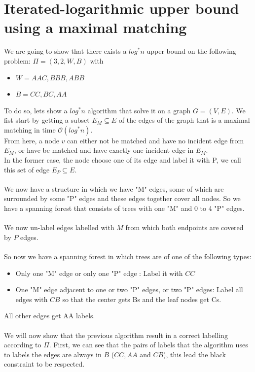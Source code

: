 \section{Iterated-logarithmic upper bound using a maximal matching}
We are going to show that there exists a $log^*n$ upper bound on the following problem:
$\Pi = (3,2,W,B)$
with
\begin{itemize}
    \item $W = AAC, BBB, ABB$
    \item $B = CC, BC, AA$
\end{itemize}
To do so, lets show a $log^*n$ algorithm that solve it on a graph $G=(V,E)$.
We fist start by getting a subset $E_M\subseteq E$ of the edges of the graph that is a maximal matching in time $\mathcal{O}(log^*n)$.\\
From here, a node $v$ can either not be matched and have no incident edge from $E_M$, or have be matched and have exactly one incident edge in $E_M$.\\
In the former case, the node choose one of its edge and label it with P, we call this set of edge $E_P\subseteq E$.\\\\
We now have a structure in which we have "M" edges, some of which are surrounded by some "P" edges and these edges together cover all nodes. So we have a spanning forest that consists of trees with one "M" and 0 to 4 "P" edges.\\\\
We now un-label edges labelled with $M$ from which both endpoints are covered by $P$ edges.\\\\
So now we have a spanning forest in which trees are of one of the following types:
\begin{itemize}
    \item Only one "M" edge or only one "P" edge : Label it with $CC$
    \item One "M" edge adjacent to one or two "P" edges, or two "P" edges: Label all edges with $CB$ so that the center gets Bs and the leaf nodes get Cs.
\end{itemize}
All other edges get AA labels.\\\\
We will now show that the previous algorithm result in a correct labelling according to $\Pi$.
First, we can see that the pairs of labels that the algorithm uses to labels the edges are always in $B$ ($CC,AA$ and $CB$), this lead the black constraint to be respected.\\\\

